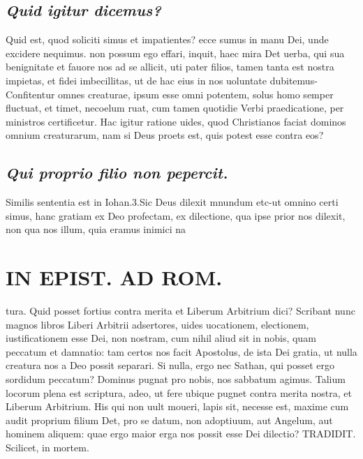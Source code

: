 \documentclass{article}
\begin{document}
\begin{pages}
\subsection*{\textit{Quid igitur dicemus? }}\pstart Quid est, quod soliciti simus et impatientes? ecce sumus in manu Dei, unde excidere nequimus. non possum ego effari, inquit, haec mira Det uerba, qui sua benignitate et fauore nos ad se allicit, uti pater filios, tamen tanta est nostra impietas, et fidei imbecillitas, ut de hac eius in nos uoluntate dubitemus-Confitentur omnes creaturae, ipsum esse omni potentem, solus homo semper fluctuat, et timet, necoelum ruat, cum tamen quotidie Verbi praedicatione, per ministros certificetur. Hac igitur ratione uides, quod Christianos faciat dominos omnium creaturarum, nam si Deus proets est, quis potest esse contra eos?  \pend
{}
{}
\subsection*{\textit{Qui proprio filio non pepercit. }}\pstart Similis sententia est in Iohan.3.Sic Deus dilexit mnundum etc-ut omnino certi simus, hanc gratiam ex Deo profectam, ex dilectione, qua ipse prior nos dilexit, non qua nos illum, quia eramus inimici na\pend
\section*{IN EPIST. AD ROM.  }
\marginpar{[ p.103 ]}\pstart tura. Quid posset fortius contra merita et Liberum Arbitrium dici? Scribant nunc magnos libros Liberi Arbitrii adsertores, uides uocationem, electionem, iustificationem esse Dei, non nostram, cum nihil aliud sit in nobis, quam peccatum et damnatio: tam certos nos facit Apostolus, de ista Dei gratia, ut nulla creatura nos a Deo possit separari. Si nulla, ergo nec Sathan, qui posset ergo sordidum peccatum? Dominus pugnat pro nobis, nos sabbatum agimus. Talium locorum plena est scriptura, adeo, ut fere ubique pugnet contra merita nostra, et Liberum Arbitrium. His qui non uult moueri, lapis sit, necesse est, maxime cum audit proprium filium Det, pro se datum, non adoptiuum, aut Angelum, aut hominem aliquem: quae ergo maior erga nos possit esse Dei dilectio? TRADIDIT. Scilicet, in mortem.   \pend
{}
{}

\end{pages}
\end{document}
